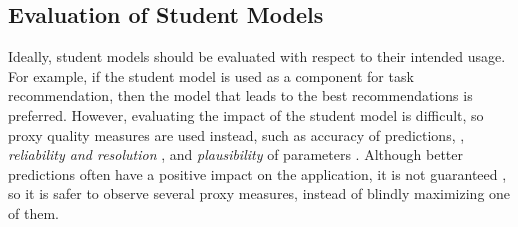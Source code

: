%


\subsection{Evaluation of Student Models}
\label{sec:student-model-evaluation}

Ideally, student models should be evaluated with respect to their intended usage.
For example, if the student model is used as a component for task recommendation,
then the model that leads to the best recommendations is preferred.
However, evaluating the impact of the student model is difficult, %
so proxy quality measures are used instead,
such as accuracy of predictions,
\cite[section 3]{pelanek-evaluation-student-models},
\emph{reliability and resolution} %
\cite[section 5]{pelanek-evaluation-student-models},
and \emph{plausibility} of parameters \cite{learner-models-integration-skills}.
Although better predictions often have a positive impact on the application,
it is not guaranteed \cite{evaluation-leopard},
so it is safer to observe several proxy measures,
instead of blindly maximizing one of them. %

